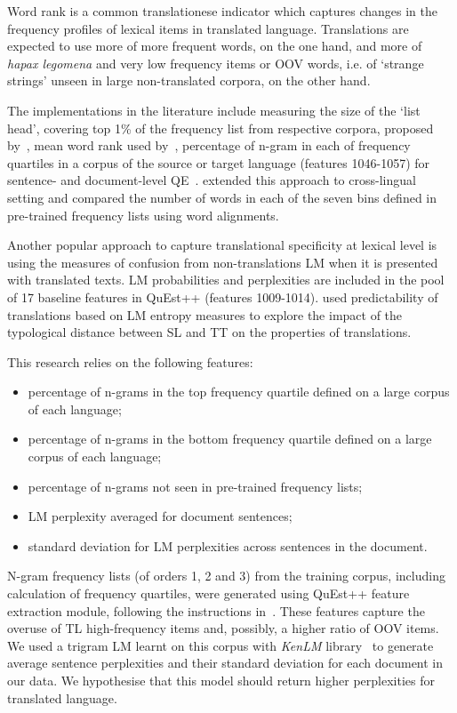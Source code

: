 Word rank is a common translationese indicator which captures changes in the frequency profiles of lexical items in translated language. Translations are expected to use more of more frequent words, on the one hand, and more of \textit{hapax legomena} and very low frequency items or \gls{OOV} words, i.e. of `strange strings' unseen in large non-translated corpora, on the other hand. 

The implementations in the literature include measuring the size of the `list head', covering top 1\% of the frequency list from respective corpora, proposed by~\citet{Laviosa1998}, mean word rank used by~\citet{Volansky2015}, percentage of n-gram in each of frequency quartiles in a corpus of the source or target language (features 1046-1057) for sentence- and document-level \gls{QE}~\cite{Scarton2016}. \citet{Sominsky2019} extended this approach to cross-lingual setting and compared the number of words in each of the seven bins defined in pre-trained frequency lists using word alignments.

Another popular approach to capture translational specificity at lexical level is using the measures of confusion from non-translations \gls{LM} when it is presented with translated texts. \gls{LM} probabilities and perplexities are included in the pool of 17 baseline features in QuEst++ (features 1009-1014).
\cite{Nikolaev2020} used predictability of translations based on LM entropy measures to explore the impact of the typological distance between SL and TT on the properties of translations. 

\label{pg:ngrams}
This research relies on the following features:
\begin{itemize}\compresslist{}
	\item percentage of n-grams in the top frequency quartile defined on a large corpus of each language;
	\item percentage of n-grams in the bottom frequency quartile defined on a large corpus of each language;
	\item percentage of n-grams not seen in pre-trained frequency lists;
	\item LM perplexity averaged for document sentences;
	\item standard deviation for LM perplexities across sentences in the document. 
\end{itemize}

N-gram frequency lists (of orders 1, 2 and 3) from the training corpus, including calculation of frequency quartiles, were generated using QuEst++ feature extraction module, following the instructions in~\citet{Specia2016}.
These features capture the overuse of TL high-frequency items and, possibly, a higher ratio of OOV items. 
We used a trigram LM learnt on this corpus with \textit{KenLM} library~\cite{Heafield2011} to generate average sentence perplexities and their standard deviation for each document in our data. We hypothesise that this model should return higher perplexities for translated language. 

